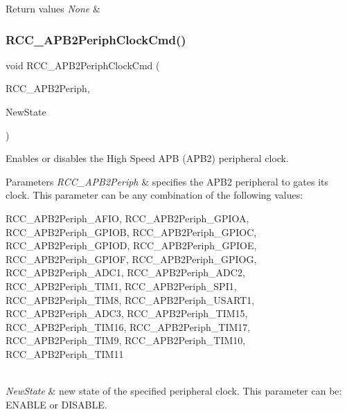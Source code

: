 \begin{DoxyRetVals}{Return values}
{\em None} & \\
\hline
\end{DoxyRetVals}
\mbox{\label{group___r_c_c___private___functions_ga56ff55caf8d835351916b40dd030bc87}} 
\subsubsection{\texorpdfstring{RCC\_APB2PeriphClockCmd()}{RCC\_APB2PeriphClockCmd()}}
{\footnotesize\ttfamily void R\+C\+C\+\_\+\+A\+P\+B2\+Periph\+Clock\+Cmd (\begin{DoxyParamCaption}\item[{uint32\+\_\+t}]{R\+C\+C\+\_\+\+A\+P\+B2\+Periph,  }\item[{\mbox{\hyperlink{group___exported__types_gac9a7e9a35d2513ec15c3b537aaa4fba1}{Functional\+State}}}]{New\+State }\end{DoxyParamCaption})}



Enables or disables the High Speed A\+PB (A\+P\+B2) peripheral clock. 


\begin{DoxyParams}{Parameters}
{\em R\+C\+C\+\_\+\+A\+P\+B2\+Periph} & specifies the A\+P\+B2 peripheral to gates its clock. This parameter can be any combination of the following values\+: \begin{DoxyItemize}
\item R\+C\+C\+\_\+\+A\+P\+B2\+Periph\+\_\+\+A\+F\+IO, R\+C\+C\+\_\+\+A\+P\+B2\+Periph\+\_\+\+G\+P\+I\+OA, R\+C\+C\+\_\+\+A\+P\+B2\+Periph\+\_\+\+G\+P\+I\+OB, R\+C\+C\+\_\+\+A\+P\+B2\+Periph\+\_\+\+G\+P\+I\+OC, R\+C\+C\+\_\+\+A\+P\+B2\+Periph\+\_\+\+G\+P\+I\+OD, R\+C\+C\+\_\+\+A\+P\+B2\+Periph\+\_\+\+G\+P\+I\+OE, R\+C\+C\+\_\+\+A\+P\+B2\+Periph\+\_\+\+G\+P\+I\+OF, R\+C\+C\+\_\+\+A\+P\+B2\+Periph\+\_\+\+G\+P\+I\+OG, R\+C\+C\+\_\+\+A\+P\+B2\+Periph\+\_\+\+A\+D\+C1, R\+C\+C\+\_\+\+A\+P\+B2\+Periph\+\_\+\+A\+D\+C2, R\+C\+C\+\_\+\+A\+P\+B2\+Periph\+\_\+\+T\+I\+M1, R\+C\+C\+\_\+\+A\+P\+B2\+Periph\+\_\+\+S\+P\+I1, R\+C\+C\+\_\+\+A\+P\+B2\+Periph\+\_\+\+T\+I\+M8, R\+C\+C\+\_\+\+A\+P\+B2\+Periph\+\_\+\+U\+S\+A\+R\+T1, R\+C\+C\+\_\+\+A\+P\+B2\+Periph\+\_\+\+A\+D\+C3, R\+C\+C\+\_\+\+A\+P\+B2\+Periph\+\_\+\+T\+I\+M15, R\+C\+C\+\_\+\+A\+P\+B2\+Periph\+\_\+\+T\+I\+M16, R\+C\+C\+\_\+\+A\+P\+B2\+Periph\+\_\+\+T\+I\+M17, R\+C\+C\+\_\+\+A\+P\+B2\+Periph\+\_\+\+T\+I\+M9, R\+C\+C\+\_\+\+A\+P\+B2\+Periph\+\_\+\+T\+I\+M10, R\+C\+C\+\_\+\+A\+P\+B2\+Periph\+\_\+\+T\+I\+M11\end{DoxyItemize}
\\
\hline
{\em New\+State} & new state of the specified peripheral clock. This parameter can be\+: E\+N\+A\+B\+LE or D\+I\+S\+A\+B\+LE. \\
\hline
\end{DoxyParams}

